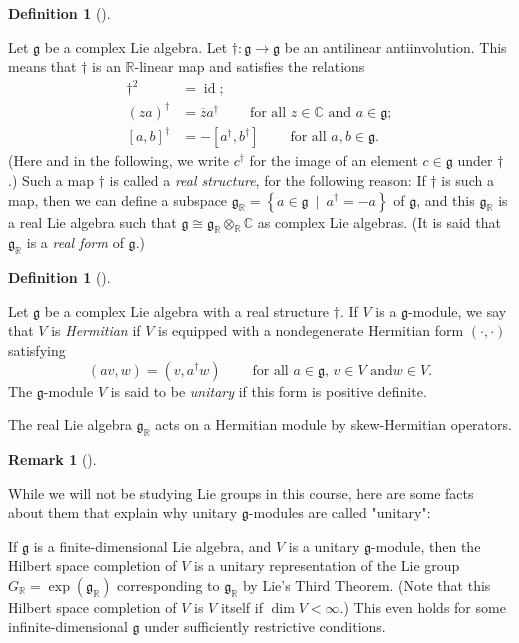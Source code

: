 \documentclass
[numbers=enddot,12pt,final,onecolumn,german,notitlepage]{scrartcl}%
\theoremstyle{definition}
\newtheorem{defi}[theo]{Definition}
\newenvironment{definition}[1][]
{\begin{defi}[#1]\begin{leftbar}}
{\end{leftbar}\end{defi}}
\newtheorem{remk}[theo]{Remark}
\newenvironment{remark}[1][]
{\begin{remk}[#1]\begin{leftbar}}
{\end{leftbar}\end{remk}}
\begin{document}
\begin{definition}
Let $\mathfrak{g}$ be a complex Lie algebra. Let $\dag:\mathfrak{g}%
\rightarrow\mathfrak{g}$ be an antilinear antiinvolution. This means that
$\dag$ is an $\mathbb{R}$-linear map and satisfies the relations%
\begin{align*}
\dag^{2}  &  =\operatorname*{id};\\
\left(  za\right)  ^{\dag}  &  =\overline{z}a^{\dag}%
\ \ \ \ \ \ \ \ \ \ \text{for all }z\in\mathbb{C}\text{ and }a\in
\mathfrak{g};\\
\left[  a,b\right]  ^{\dag}  &  =-\left[  a^{\dag},b^{\dag}\right]
\ \ \ \ \ \ \ \ \ \ \text{for all }a,b\in\mathfrak{g}.
\end{align*}
(Here and in the following, we write $c^{\dag}$ for the image of an element
$c\in\mathfrak{g}$ under $\dag$.) Such a map $\dag$ is called a \textit{real
structure}, for the following reason: If $\dag$ is such a map, then we can
define a subspace $\mathfrak{g}_{\mathbb{R}}=\left\{  a\in\mathfrak{g}%
\ \mid\ a^{\dag}=-a\right\}  $ of $\mathfrak{g}$, and this $\mathfrak{g}%
_{\mathbb{R}}$ is a real Lie algebra such that $\mathfrak{g}\cong%
\mathfrak{g}_{\mathbb{R}}\otimes_{\mathbb{R}}\mathbb{C}$ as complex Lie
algebras. (It is said that $\mathfrak{g}_{\mathbb{R}}$ is a \textit{real form}
of $\mathfrak{g}$.)
\end{definition}

\begin{definition}
Let $\mathfrak{g}$ be a complex Lie algebra with a real structure $\dag$. If
$V$ is a $\mathfrak{g}$-module, we say that $V$ is \textit{Hermitian} if $V$
is equipped with a nondegenerate Hermitian form $\left(  \cdot,\cdot\right)  $
satisfying%
\[
\left(  av,w\right)  =\left(  v,a^{\dag}w\right)
\ \ \ \ \ \ \ \ \ \ \text{for all }a\in\mathfrak{g}\text{, }v\in V\text{ and
}w\in V.
\]
The $\mathfrak{g}$-module $V$ is said to be \textit{unitary} if this form is
positive definite.
\end{definition}

The real Lie algebra $\mathfrak{g}_{\mathbb{R}}$ acts on a Hermitian module by
skew-Hermitian operators.

\begin{remark}
While we will not be studying Lie groups in this course, here are some facts
about them that explain why unitary $\mathfrak{g}$-modules are called "unitary":

If $\mathfrak{g}$ is a finite-dimensional Lie algebra, and $V$ is a unitary
$\mathfrak{g}$-module, then the Hilbert space completion of $V$ is a unitary
representation of the Lie group $G_{\mathbb{R}}=\exp\left(  \mathfrak{g}%
_{\mathbb{R}}\right)  $ corresponding to $\mathfrak{g}_{\mathbb{R}}$ by Lie's
Third Theorem. (Note that this Hilbert space completion of $V$ is $V$ itself
if $\dim V<\infty$.) This even holds for some infinite-dimensional
$\mathfrak{g}$ under sufficiently restrictive conditions.
\end{remark}
\end{document}
